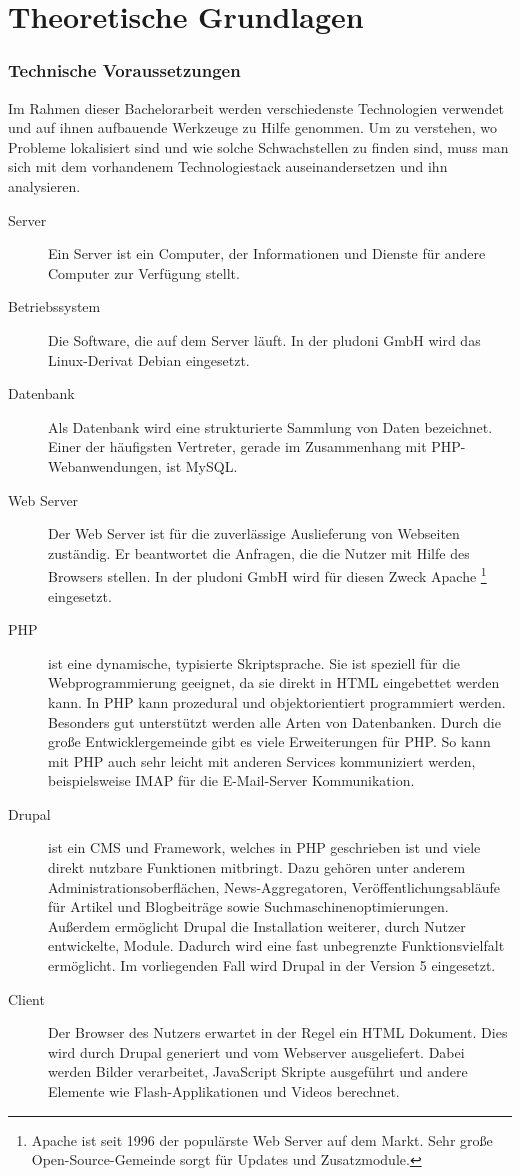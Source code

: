 \part{Theoretische Grundlagen}
\label{sec:theory}

\section{Technische Voraussetzungen}
Im Rahmen dieser Bachelorarbeit werden verschiedenste Technologien verwendet und auf ihnen aufbauende Werkzeuge zu Hilfe genommen. Um zu verstehen, wo Probleme lokalisiert sind und wie solche Schwachstellen zu finden sind, muss man sich mit dem vorhandenem Technologiestack auseinandersetzen und ihn analysieren.
\begin{description}
  \item[Server] Ein Server ist ein Computer, der Informationen und Dienste für andere Computer zur Verfügung stellt.
  \item[Betriebssystem] Die Software, die auf dem Server läuft. In der pludoni GmbH wird das Linux-Derivat Debian eingesetzt.
  \item[Datenbank] Als Datenbank wird eine strukturierte Sammlung von Daten bezeichnet. Einer der häufigsten Vertreter, gerade im Zusammenhang mit PHP-Webanwendungen, ist MySQL.
  \item[Web Server] Der Web Server ist für die zuverlässige Auslieferung von Webseiten zuständig. Er beantwortet die Anfragen, die die Nutzer mit Hilfe des Browsers stellen. In der pludoni GmbH wird f\"ur diesen Zweck Apache \footnote{Apache ist seit 1996 der popul\"arste Web Server auf dem Markt. Sehr gro\ss{}e Open-Source-Gemeinde sorgt f\"ur Updates und Zusatzmodule.} eingesetzt.
  \item[PHP] ist eine dynamische, typisierte Skriptsprache. Sie ist speziell f\"ur die Webprogrammierung geeignet, da sie direkt in HTML eingebettet werden kann.\citep{PHP2011} In PHP kann prozedural und objektorientiert programmiert werden. Besonders gut unterst\"utzt werden alle Arten von Datenbanken. Durch die gro\ss{}e Entwicklergemeinde gibt es viele Erweiterungen f\"ur PHP. So kann mit PHP auch sehr leicht mit anderen Services kommuniziert werden, beispielsweise IMAP f\"ur die E-Mail-Server Kommunikation.\citep{PHP2011a}
  \item[Drupal] ist ein CMS und Framework, welches in PHP geschrieben ist und viele direkt nutzbare Funktionen mitbringt. Dazu gehören unter anderem Administrationsoberflächen, News-Aggregatoren, Veröffentlichungsabläufe für Artikel und Blogbeiträge sowie Suchmaschinenoptimierungen. Außerdem ermöglicht Drupal die Installation weiterer, durch Nutzer entwickelte, Module. Dadurch wird eine fast unbegrenzte Funktionsvielfalt ermöglicht. Im vorliegenden Fall wird Drupal in der Version 5 eingesetzt.
  \item[Client] Der Browser des Nutzers erwartet in der Regel ein HTML Dokument. Dies wird durch Drupal generiert und vom Webserver ausgeliefert. Dabei werden Bilder verarbeitet, JavaScript Skripte ausgeführt und andere Elemente wie Flash-Applikationen und Videos berechnet. 
\end{description}

